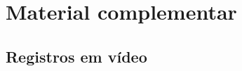 \chapter{Material complementar}
\label{ch:complementar}

\section{Registros em vídeo}
\label{sec:online}



%
%
%
%
%
%
%
%
%
